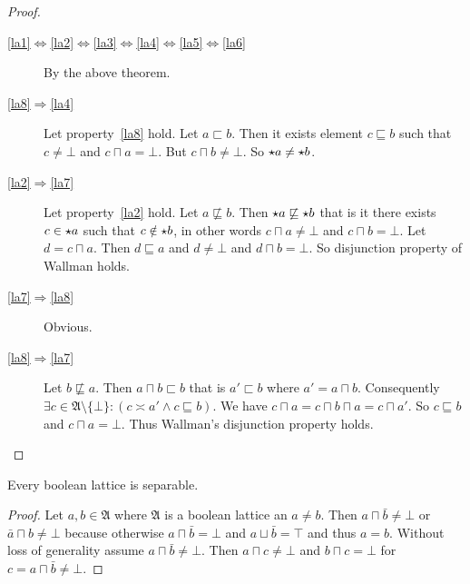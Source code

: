 \begin{proof}
~
\begin{description}
\item [{\ref{la1}$\Leftrightarrow$\ref{la2}$\Leftrightarrow$\ref{la3}$\Leftrightarrow$\ref{la4}$\Leftrightarrow$\ref{la5}$\Leftrightarrow$\ref{la6}}] By
the above theorem.
\item [{\ref{la8}$\Rightarrow$\ref{la4}}] Let property~\ref{la8} hold.
Let $a\sqsubset b$. Then it exists element $c\sqsubseteq b$ such
that $c\neq\bot$ and $c\sqcap a=\bot$. But $c\sqcap b\neq\bot$.
So $\star a\neq\star b$.
\item [{\ref{la2}$\Rightarrow$\ref{la7}}] Let property~\ref{la2} hold.
Let $a\nsqsubseteq b$. Then $\star a\not\sqsubseteq\star b$
that is it there exists $c\in\star a$ such that $c\notin\star b$,
in other words $c\sqcap a\neq\bot$ and $c\sqcap b=\bot$. Let $d=c\sqcap a$.
Then $d\sqsubseteq a$ and $d\neq\bot$ and $d\sqcap b=\bot$. So
disjunction property of Wallman holds.
\item [{\ref{la7}$\Rightarrow$\ref{la8}}] Obvious.
\item [{\ref{la8}$\Rightarrow$\ref{la7}}] Let $b\nsqsubseteq a$. Then
$a\sqcap b\sqsubset b$ that is $a'\sqsubset b$ where $a'=a\sqcap b$.
Consequently $\exists c\in\mathfrak{A}\setminus\{\bot\}:(c\asymp a'\land c\sqsubseteq b)$.
We have $c\sqcap a=c\sqcap b\sqcap a=c\sqcap a'$. So $c\sqsubseteq b$
and $c\sqcap a=\bot$. Thus Wallman's disjunction property holds.
\end{description}
\end{proof}
\begin{prop}
Every boolean lattice is separable.\end{prop}
\begin{proof}
Let $a,b\in\mathfrak{A}$ where $\mathfrak{A}$ is a boolean lattice
an $a\neq b$. Then $a\sqcap\bar{b}\neq\bot$ or $\bar{a}\sqcap b\neq\bot$
because otherwise $a\sqcap\bar{b}=\bot$ and $a\sqcup\bar{b}=\top$
and thus $a=b$. Without loss of generality assume $a\sqcap\bar{b}\neq\bot$.
Then $a\sqcap c\neq\bot$ and $b\sqcap c=\bot$ for $c=a\sqcap\bar{b}\neq\bot$.
\end{proof}

